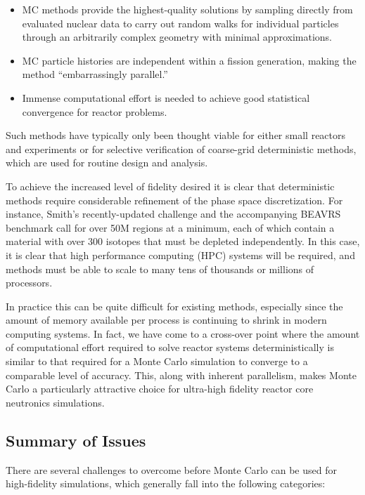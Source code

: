 \documentclass[12pt,twoside]{mitthesis-exec}
\begin{document}
\begin{itemize}
  \item MC methods provide the highest-quality solutions by sampling directly from
  evaluated nuclear data to carry out random walks for individual particles
  through an arbitrarily complex geometry with minimal approximations.
  \item MC particle histories are independent within a fission generation, making
  the method ``embarrassingly parallel.''
  \item Immense computational effort is needed to achieve good statistical
  convergence for reactor problems.
\end{itemize}

Such methods have typically only been thought viable for either small reactors
and experiments or for selective verification of coarse-grid deterministic
methods, which are used for routine design and analysis.

To achieve the increased level of fidelity desired it is clear that
deterministic methods require considerable refinement of the phase space discretization.
For instance, Smith's recently-updated challenge and the accompanying BEAVRS benchmark
call for over 50M regions at a minimum, each of which contain a material with
over 300 isotopes that must be depleted independently. In this case, it is clear
that high performance computing (HPC) systems will be required, and methods must
be able to scale to many tens of thousands or millions of processors.

In practice this can be quite difficult for existing methods, especially since
the amount of memory available per process is continuing to shrink in modern
computing systems. In fact, we have come to a cross-over point where the
amount of computational effort required to solve reactor systems
deterministically is similar to that required for a Monte Carlo simulation to
converge to a comparable level of accuracy. This, along with inherent
parallelism, makes Monte Carlo a particularly attractive choice
for ultra-high fidelity reactor core neutronics simulations.

\newpage
\subsection*{Summary of Issues}

There are several challenges to overcome before Monte Carlo can be used for
high-fidelity simulations, which generally fall into the following categories:
\end{document}
